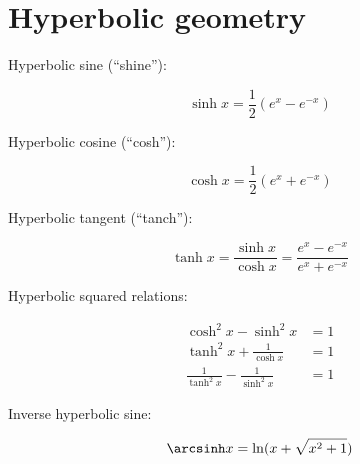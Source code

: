\chapter{Hyperbolic geometry}

Hyperbolic sine (``shine''):

\begin{equation}
    \sinh x = \frac{1}{2}(e^x - e^{-x})
    \label{eq:sinh}
\end{equation}

Hyperbolic cosine (``cosh''):

\begin{equation}
    \cosh x = \frac{1}{2}(e^x + e^{-x})
    \label{eq:cosh}
\end{equation}

Hyperbolic tangent (``tanch''):

\begin{equation}
    \tanh x = \frac{\sinh x}{\cosh x} = \frac{e^x - e^{-x}}{e^x + e^{-x}}
    \label{eq:tanh}
\end{equation}

Hyperbolic squared relations:

\begin{equation}
    \begin{aligned}
        \cosh^2 x - \sinh^2 x &= 1\\
        \tanh^2 x + \frac{1}{\cosh x} &= 1\\
        \frac{1}{\tanh^2 x} - \frac{1}{\sinh^2 x} &= 1
    \end{aligned}
    \label{eq:hyperbolic_squared}
\end{equation}

Inverse hyperbolic sine:

\begin{equation}
    \arcsinh x = \ln(x + \sqrt{x^2 + 1})
    \label{eq:arcsinh}
\end{equation}
